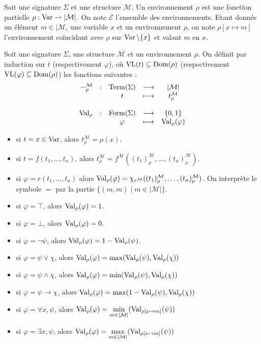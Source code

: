\begin{definition}[Environnement]
  Soit une signature $\Sigma$ et une structure $\mathcal M$. Un environnement
  $\rho$ est une fonction partielle $\rho : \operatorname{Var}\rightharpoonup |\mathcal M|$. On
  note $\mathcal E$ l'ensemble des environnements. Etant donnés un élément
  $m\in|\mathcal M$, une variable $x$ et un environnement $\rho$, on note
  $\rho[x \mapsto m]$ l'environnement coïncidant avec $\rho$ sur
  $\operatorname{Var}\backslash\{x\}$ et valant $m$ en $x$.
\end{definition}

\begin{definition}
  Soit une signature $\Sigma$, une structure $\mathcal M$ et un environnement
  $\rho$. On définit par induction sur $t$ (respectivement $\varphi$), où
  $\operatorname{VL}(t)\subseteq\operatorname{Dom}(\rho)$ (respectivement $\operatorname{VL}(\varphi)\subseteq\operatorname{Dom}(\rho)$)
  les fonctions suivantes :
  \[\begin{array}{rcccc}
  -_\rho^\mathcal M & : & \operatorname{Term}(\Sigma) & \longrightarrow & |\mathcal M|\\
  & & t & \longmapsto & t^{\mathcal M}_\rho\\
  \\
  \operatorname{Val}_\rho & : & \operatorname{Form}(\Sigma) & \longrightarrow & \{0,1\}\\
  & & \varphi & \longmapsto & \operatorname{Val}_\rho(\varphi)
  \end{array}\]

  \begin{itemize}
  \item si $t = x \in \operatorname{Var}$, alors $t^\mathcal M_\rho = \rho(x)$.
  \item si $t = f(t_1,\ldots,t_n)$, alors
    $t_\rho^\mathcal M =
    f^\mathcal M((t_1)^\mathcal M_\rho,\ldots,(t_n)^\mathcal M_\rho)$.
  \item si $\varphi = r(t_1,\ldots,t_n)$ alors
    $\operatorname{Val}_\rho(\varphi) =
    \chi_{r^\mathcal M}((t_1)^\mathcal M_\rho,\ldots,(t_n)^\mathcal M_\rho)$.
    On interprète le symbole $=$ par la partie
    $\{(m,m)\mid m\in |\mathcal M|\}$.
  \item si $\varphi = \top$, alors $\operatorname{Val}_\rho(\varphi) = 1$.
  \item si $\varphi = \bot$, alors $\operatorname{Val}_\rho(\varphi) = 0$.
  \item si $\varphi = \lnot \psi$, alors
    $\operatorname{Val}_\rho(\varphi) = 1 - \operatorname{Val}_\rho(\psi)$.
  \item si $\varphi = \psi \lor \chi$, alors
    $\operatorname{Val}_\rho(\varphi) = \max(\operatorname{Val}_\rho(\psi),\operatorname{Val}_\rho(\chi))$
  \item si $\varphi = \psi \land \chi$, alors
    $\operatorname{Val}_\rho(\varphi) = \min(\operatorname{Val}_\rho(\psi),\operatorname{Val}_\rho(\chi))$
  \item si $\varphi = \psi \to \chi$, alors
    $\operatorname{Val}_\rho(\varphi) = \max(1 - \operatorname{Val}_\rho(\psi),\operatorname{Val}_\rho(\chi))$
  \item si $\varphi = \forall x, \psi$, alors
    $\displaystyle\operatorname{Val}_\rho(\varphi) =
    \min_{m \in |\mathcal M|}(\operatorname{Val}_{\rho[x\mapsto m]}(\psi))$
  \item si $\varphi = \exists x, \psi$, alors
    $\displaystyle\operatorname{Val}_\rho(\varphi) =
    \max_{m \in |\mathcal M|}(\operatorname{Val}_{\rho[x\mapsto m]}(\psi))$
  \end{itemize}
  

\end{definition}
